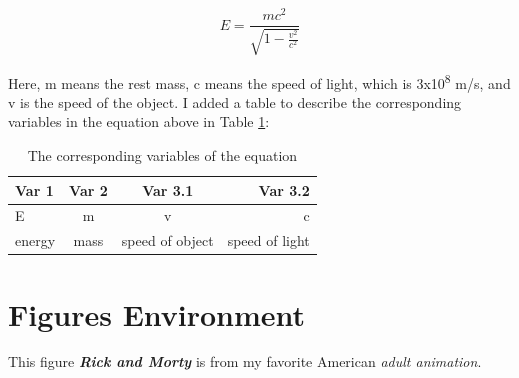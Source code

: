 \documentclass[12pt, letterpaper]{article} %
\begin{document}
\begin{equation} 
  E = \frac{mc^2}{\sqrt{1-\frac{v^2}{c^2}}}
  \label{eq:1}  
\end{equation} %

Here, m means the rest mass, c means the speed of light, which is 3x10\textsuperscript{8} m/s, and v is the speed 
of the object. I added a table to describe the corresponding variables in the equation above in 
Table \ref{tab:tab1}: %

\begin{table}[!h] %
  \begin{center} %
  \begin{tabular}{|l|c|c|r|} %
    \hline %
    Var 1 & Var 2 & Var 3.1 & Var 3.2\\ %
    \hline %
    \hline %
    E & m &v & c\\ %
    \hline %
    \hline %
    energy & mass& speed of object & speed of light \\ %
    \hline %
  \end{tabular} %
  \caption{The corresponding variables of the equation } %
  \label{tab:tab1} %
  \end{center} %
\end{table} %





\section{Figures Environment} %
\graphicspath{ {./images/} } %
This figure \textit{\textbf{Rick and Morty }} is from my favorite American \textit{adult animation}.
\end{document}
